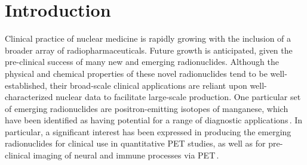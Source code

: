 
\section{\label{sec:intro_fe}Introduction}



Clinical practice of nuclear medicine is rapidly growing with the inclusion of a broader array of radiopharmaceuticals. 
Future growth is anticipated, given the pre-clinical success of many  new and emerging radionuclides. 
Although the physical and chemical properties of these novel radionuclides tend to be
well-established, their broad-scale  clinical applications are reliant upon well-characterized nuclear data to facilitate large-scale   production. 
% 
% 
% 
One particular set of  emerging radionuclides are 
positron-emitting isotopes of manganese, which have been identified as having potential for a range of diagnostic applications\,\cite{J.2013,Graves2015,Lewis2015,PhysRevC.96.014613,Wooten2017,Hernandez2017}.
In particular, a significant interest has been expressed in producing the emerging radionuclides  for clinical use in quantitative PET studies, as well as   for pre-clinical imaging of neural and immune processes via PET\,\cite{Graves2016}. 

